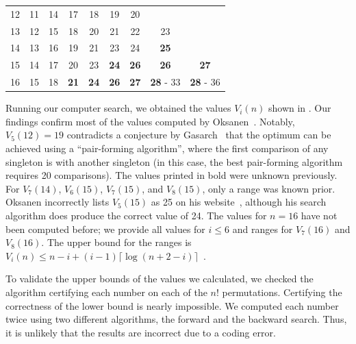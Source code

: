 \documentclass[a4paper,UKenglish,cleveref, autoref, thm-restate]{lipics-v2021}
\begin{document}
\begin{table}[!t]
\begin{tabular}{c|cccccccc}
    12  & 11                      & 14 & 17          & 18          & 19          & 20                                                \\
    13  & 12                      & 15 & 18          & 20          & 21          & 22          & 23                                  \\
    14  & 13                      & 16 & 19          & 21          & 23          & 24          & \textbf{25}                         \\
    15  & 14                      & 17 & 20          & 23          & \textbf{24} & \textbf{26} & \textbf{26}      & \textbf{27}      \\
    16  & 15                      & 18 & \textbf{21} & \textbf{24} & \textbf{26} & \textbf{27} & \textbf{28} - 33 & \textbf{28} - 36 \\
  \end{tabular}
  \vspace{-\baselineskip}
\end{table}

Running our computer search, we obtained the values $V_i(n)$ shown in .
Our findings confirm most of the values computed by Oksanen~\cite{Oksanen}.
Notably, $V_5(12) = 19$ contradicts a conjecture by Gasarch~\cite{Gasarch1996} that the optimum can be achieved using a ``pair-forming algorithm'', where the first comparison of any singleton is with another singleton (in this case, the best pair-forming algorithm requires 20 comparisons).
The values printed in bold were unknown previously.
For $V_7(14)$, $V_6(15)$, $V_7(15)$, and $V_8(15)$, only a range was known prior.
Oksanen incorrectly lists $V_5(15)$ as 25 on his website~\cite{Oksanen}, although his search algorithm does produce the correct value of 24.
The values for $n = 16$ have not been computed before; we provide all values for $i \leq 6$ and ranges for $V_7(16)$ and $V_8(16)$.
The upper bound for the ranges is $V_i(n) \le n - i + (i - 1) \lceil \log (n + 2 - i) \rceil$~\cite{hadian1969selecting}.

\enlargethispage{\baselineskip}
To validate the upper bounds of the values we calculated, we checked the algorithm certifying each number on each of the $n!$ permutations.
Certifying the correctness of the lower bound is nearly impossible.
We computed each number twice using two different algorithms, the forward and the backward search.
Thus, it is unlikely that the results are incorrect due to a coding error.
\end{document}
